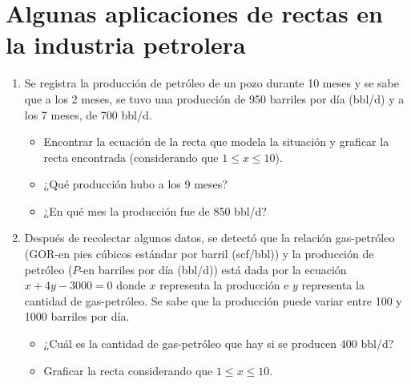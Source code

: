 \documentclass[11pt]{article}
\begin{document}
\section*{Algunas aplicaciones de rectas en la industria petrolera}



\begin{enumerate}[\hspace{-7mm}$1)$]
\item  Se registra la producción de petróleo de un pozo durante 10 meses y se sabe que a los 2 meses,
se tuvo una producción de 950 barriles por día (bbl/d) y a los 7 meses, de 700 bbl/d.

\begin{itemize}
    \item[(a)] Encontrar la ecuación de la recta que modela la situación y graficar la recta encontrada
    (considerando que $1 \leq x \leq 10$).
    \item[(b)] ¿Qué producción hubo a los 9 meses?
    \item[(c)] ¿En qué mes la producción fue de 850 bbl/d?
\end{itemize}

\item Después de recolectar algunos datos, se detectó que la relación gas-petróleo (GOR-en pies
cúbicos estándar por barril (scf/bbl)) y la producción de petróleo ($P$-en barriles por día
(bbl/d)) está dada por la ecuación $x + 4y - 3000 = 0$ donde $x$ representa la producción e $y$
representa la cantidad de gas-petróleo. Se sabe que la producción puede variar entre 100 y
1000 barriles por día.

\begin{itemize}
    \item[(a)] ¿Cuál es la cantidad de gas-petróleo que hay si se producen 400 bbl/d?
    \item[(b)] Graficar la recta considerando que $1 \leq x \leq 10$.
\end{itemize}
\end{enumerate}
\end{document}
